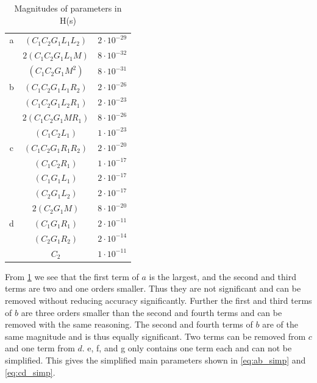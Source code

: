 \begin{table}[H]
    \centering
    \begin{tabular}{c|c|c}
        a & $(C_1 C_2 G_1 L_1 L_2)$   & $2 \cdot 10^{-29}$ \\
          & $2 (C_1 C_2 G_1 L_1 M)$   & $8 \cdot 10^{-32}$ \\
          & $(C_1 C_2 G_1 M^2)$       & $8 \cdot 10^{-31}$ \\
        \hline
        b & $(C_1 C_2 G_1 L_1 R_2)$   & $2 \cdot 10^{-26}$ \\
          & $(C_1 C_2 G_1 L_2 R_1)$   & $2 \cdot 10^{-23}$ \\
          & $2 (C_1 C_2 G_1 M R_1)$   & $8 \cdot 10^{-26}$ \\
          & $(C_1 C_2 L_1)$           & $1 \cdot 10^{-23}$ \\
        \hline
        c & $(C_1 C_2 G_1 R_1 R_2)$   & $2 \cdot 10^{-20}$ \\
          & $(C_1 C_2 R_1)$           & $1 \cdot 10^{-17}$ \\
          & $(C_1 G_1 L_1)$           & $2 \cdot 10^{-17}$ \\
          & $(C_2 G_1 L_2)$           & $2 \cdot 10^{-17}$ \\
          & $2 (C_2 G_1 M)$           & $8 \cdot 10^{-20}$ \\
        \hline
        d & $(C_1 G_1 R_1)$           & $2 \cdot 10^{-11}$ \\
          & $(C_2 G_1 R_2)$           & $2 \cdot 10^{-14}$ \\
          & $C_2$                     & $1 \cdot 10^{-11}$ \\
    \end{tabular}
    \caption{Magnitudes of parameters in H(s)}
    \label{tab:termsh}
\end{table}

From \cref{tab:termsh} we see that the first term of $a$ is the largest, and the second and third terms are two and one orders smaller. Thus they are not significant and can be removed without reducing accuracy significantly. Further the first and third terms of $b$ are three orders smaller than the second and fourth terms and can be removed with the same reasoning. The second and fourth terms of $b$ are of the same magnitude and is thus equally significant. Two terms can be removed from $c$ and one term from $d$. e, f, and g only contains one term each and can not be simplified. This gives the simplified main parameters shown in \cref{eq:ab_simp} and \cref{eq:cd_simp}.

